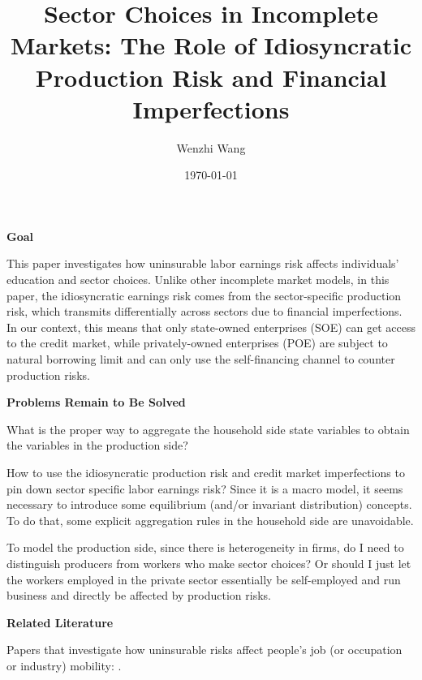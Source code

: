 \documentclass[12pt]{article}
\theoremstyle{definition}
\begin{document}
\title{\bf {Sector Choices in Incomplete Markets: The Role of Idiosyncratic Production Risk and Financial Imperfections}} 
\author{Wenzhi Wang} 
\date{\today}
\maketitle

\begin{spacing}{1}

{\noindent \bf Goal}

This paper investigates how uninsurable labor earnings risk affects individuals' education and sector choices. Unlike other incomplete market models, in this paper, the idiosyncratic earnings risk comes from the sector-specific production risk, which transmits differentially across sectors due to financial imperfections. In our context, this means that only state-owned enterprises (SOE) can get access to the credit market, while privately-owned enterprises (POE) are subject to natural borrowing limit and can only use the self-financing channel to counter production risks.

{\noindent \bf Problems Remain to Be Solved}

What is the proper way to aggregate the household side state variables to obtain the variables in the production side?

How to use the idiosyncratic production risk and credit market imperfections to pin down sector specific labor earnings risk? Since it is a macro model, it seems necessary to introduce some equilibrium (and/or invariant distribution) concepts. To do that, some explicit aggregation rules in the household side are unavoidable.

To model the production side, since there is heterogeneity in firms, do I need to distinguish producers from workers who make sector choices? Or should I just let the workers employed in the private sector essentially be self-employed and run business and directly be affected by production risks.

{\noindent \bf Related Literature}

Papers that investigate how uninsurable risks affect people's job (or occupation or industry) mobility: \citet{cubas2020, kambourov2009, dillon2018, neumuller2015, hawkins2016, cubas2023, cubas2017, low2010, liu2019, altonji2013, dvorkin2019, lee2006}.


\end{spacing}
\end{document}
